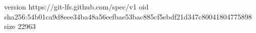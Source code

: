 version https://git-lfs.github.com/spec/v1
oid sha256:54b01ca9d8eee34ba48a56eefbae53bac885cf5ebdf21d347c80041804775898
size 22963
